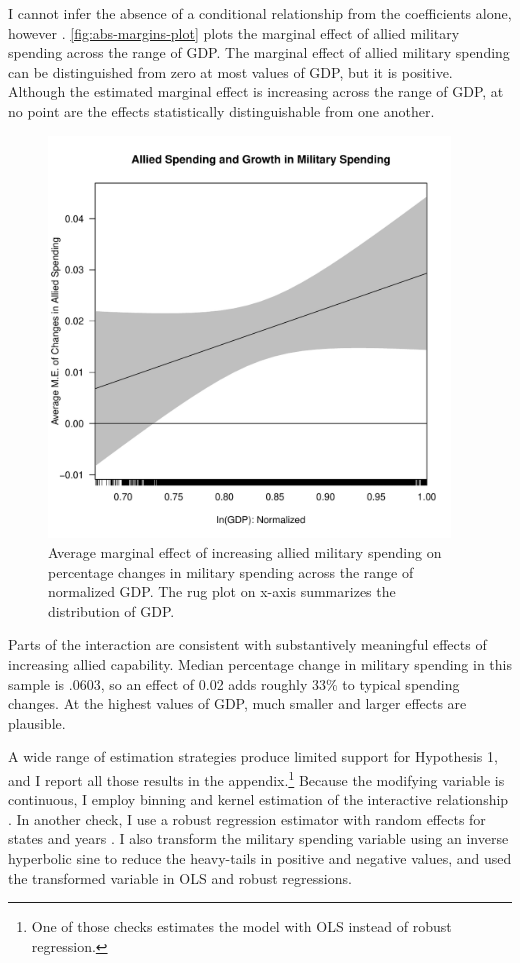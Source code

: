 \documentclass[12pt]{article}
\begin{document}
I cannot infer the absence of a conditional relationship from the coefficients alone, however \citep{BramborClarkGolder2006}. 
\autoref{fig:abs-margins-plot} plots the marginal effect of allied military spending across the range of GDP. 
The marginal effect of allied military spending can be distinguished from zero at most values of GDP, but it is positive. 
Although the estimated marginal effect is increasing across the range of GDP, at no point are the effects statistically distinguishable from one another. 


\begin{figure}
	\centering
		\includegraphics[width=0.95\textwidth]{abs-margins-plot.pdf}
	\caption{Average marginal effect of increasing allied military spending on percentage changes in military spending across the range of normalized GDP. The rug plot on x-axis summarizes the distribution of GDP.}
		\label{fig:abs-margins-plot}
\end{figure}


Parts of the interaction are consistent with substantively meaningful effects of increasing allied capability. 
Median percentage change in military spending in this sample is .0603, so an effect of 0.02 adds roughly 33\% to typical spending changes. 
At the highest values of GDP, much smaller and larger effects are plausible. 


A wide range of estimation strategies produce limited support for Hypothesis 1, and I report all those results in the appendix.\footnote{One of those checks estimates the model with OLS instead of robust regression.}
Because the modifying variable is continuous, I employ binning and kernel estimation of the interactive relationship \citep{Hainmuelleretal2019}.
In another check, I use a robust regression estimator with random effects for states and years \citep{Koller2016}. 
I also transform the military spending variable using an inverse hyperbolic sine to reduce the heavy-tails in positive and negative values, and used the transformed variable in OLS and robust regressions. 
\end{document}
